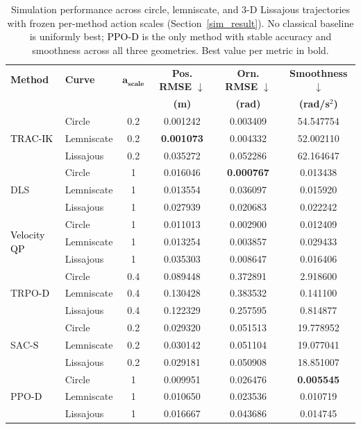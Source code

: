 \documentclass[preprint,12pt]{elsarticle}
\begin{document}
\begin{table}[!htbp]
\centering
\caption{Simulation performance across circle, lemniscate, and 3-D
Lissajous trajectories with frozen per-method action scales
(Section~\ref{sim_result}). No classical baseline is uniformly best; \textcolor{black}{PPO-D} is the only
method with stable accuracy and smoothness across all three geometries.
Best value per metric in bold.}
\label{tab:error_metrics_sim}
\footnotesize
\renewcommand{\arraystretch}{1.0}
\setlength{\tabcolsep}{4pt}
\begin{tabular}{llcccc}
\toprule
\textbf{Method} & \textbf{Curve} & $\boldsymbol{a}_{\textbf{scale}}$ & \textbf{Pos. RMSE} $\downarrow$ & \textbf{Orn. RMSE} $\downarrow$ & \textbf{Smoothness} $\downarrow$ \\
 & & & \textbf{(m)} & \textbf{(rad)} & \textbf{(rad/s$^{2}$)} \\
\midrule
\multirow{3}{*}{\textcolor{black}{TRAC-IK}}
& Circle      & 0.2 & 0.001242 & 0.003409 & 54.547754 \\
& Lemniscate  & 0.2 & \textbf{0.001073} & 0.004332 & 52.002110 \\
& Lissajous   & 0.2 & 0.035272 & 0.052286 & 62.164647 \\
\midrule
\multirow{3}{*}{DLS}
& Circle      & 1 & 0.016046 & \textbf{0.000767} & 0.013438 \\
& Lemniscate  & 1 & 0.013554 & 0.036097 & 0.015920 \\
& Lissajous   & 1 & 0.027939 & 0.020683 & 0.022242 \\
\midrule
\multirow{3}{*}{\textcolor{black}{Velocity QP}}
& Circle      & 1 & 0.011013 & 0.002900 & 0.012409 \\
& Lemniscate  & 1 & 0.013254 & 0.003857 & 0.029433 \\
& Lissajous   & 1 & 0.035303 & 0.008647 & 0.016406 \\
\midrule
\multirow{3}{*}{TRPO\textcolor{black}{-D}}
& Circle      & 0.4 & 0.089448 & 0.372891 & 2.918600 \\
& Lemniscate  & 0.4 & 0.130428 & 0.383532 & 0.141100 \\
& Lissajous   & 0.4 & 0.122329 & 0.257595 & 0.814877 \\
\midrule
\multirow{3}{*}{SAC\textcolor{black}{-S}}
& Circle      & 0.2 & 0.029320 & 0.051513 & 19.778952 \\
& Lemniscate  & 0.2 & 0.030142 & 0.051104 & 19.077041 \\
& Lissajous   & 0.2 & 0.029181 & 0.050908 & 18.851007 \\
\midrule
\multirow{3}{*}{PPO\textcolor{black}{-D}}
& Circle      & 1 & 0.009951 & 0.026476 & \textbf{0.005545} \\
& Lemniscate  & 1 & 0.010650 & 0.023536 & 0.010719 \\
& Lissajous   & 1 & 0.016667 & 0.043686 & 0.014745 \\
\bottomrule
\end{tabular}
\end{table}
\end{document}

